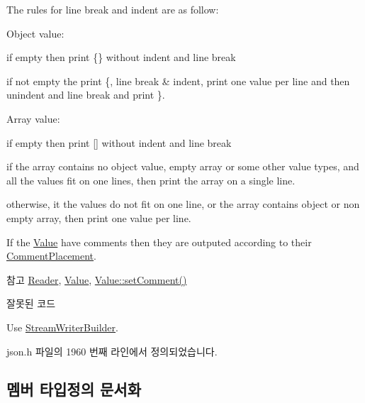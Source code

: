 The rules for line break and indent are as follow\+:
\begin{DoxyItemize}
\item Object value\+:
\begin{DoxyItemize}
\item if empty then print \{\} without indent and line break
\item if not empty the print \textquotesingle{}\{\textquotesingle{}, line break \& indent, print one value per line and then unindent and line break and print \textquotesingle{}\}\textquotesingle{}.
\end{DoxyItemize}
\item Array value\+:
\begin{DoxyItemize}
\item if empty then print \mbox{[}\mbox{]} without indent and line break
\item if the array contains no object value, empty array or some other value types, and all the values fit on one lines, then print the array on a single line.
\item otherwise, it the values do not fit on one line, or the array contains object or non empty array, then print one value per line.
\end{DoxyItemize}
\end{DoxyItemize}

If the \hyperlink{class_json_1_1_value}{Value} have comments then they are outputed according to their \hyperlink{namespace_json_a4fc417c23905b2ae9e2c47d197a45351}{Comment\+Placement}.

\begin{DoxySeeAlso}{참고}
\hyperlink{class_json_1_1_reader}{Reader}, \hyperlink{class_json_1_1_value}{Value}, \hyperlink{class_json_1_1_value_a29f3a30f7e5d3af6f38d57999bf5b480}{Value\+::set\+Comment()} 
\end{DoxySeeAlso}
\begin{DoxyRefDesc}{잘못된 코드}
\item[\hyperlink{deprecated__deprecated000009}{잘못된 코드}]Use \hyperlink{class_json_1_1_stream_writer_builder}{Stream\+Writer\+Builder}. \end{DoxyRefDesc}


json.\+h 파일의 1960 번째 라인에서 정의되었습니다.



\subsection{멤버 타입정의 문서화}
\mbox{\label{class_json_1_1_styled_writer_a798fcefa41730de612a5cf7e73003e8a}} 
